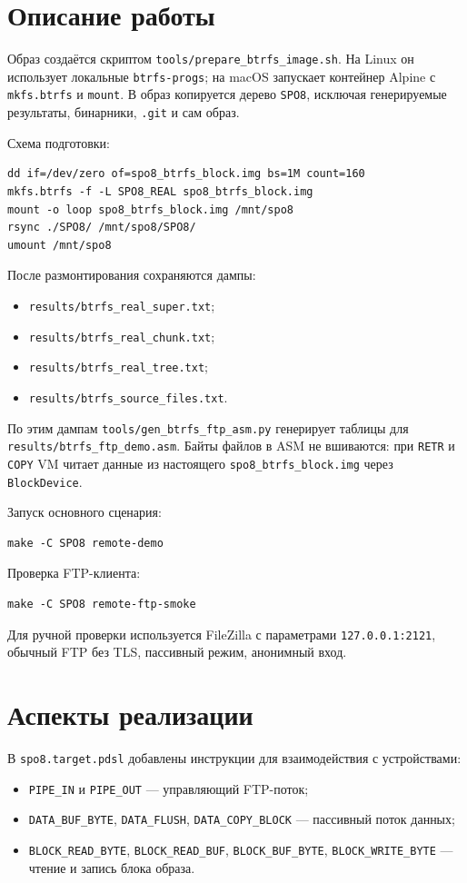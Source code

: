 \documentclass[a4paper,12pt]{article}
\begin{document}
\section{Описание работы}
Образ создаётся скриптом \texttt{tools/prepare\_btrfs\_image.sh}. На Linux он использует локальные \texttt{btrfs-progs}; на macOS запускает контейнер Alpine с \texttt{mkfs.btrfs} и \texttt{mount}. В образ копируется дерево \texttt{SPO8}, исключая генерируемые результаты, бинарники, \texttt{.git} и сам образ.

Схема подготовки:
\begin{lstlisting}
dd if=/dev/zero of=spo8_btrfs_block.img bs=1M count=160
mkfs.btrfs -f -L SPO8_REAL spo8_btrfs_block.img
mount -o loop spo8_btrfs_block.img /mnt/spo8
rsync ./SPO8/ /mnt/spo8/SPO8/
umount /mnt/spo8
\end{lstlisting}

После размонтирования сохраняются дампы:
\begin{itemize}
\item \texttt{results/btrfs\_real\_super.txt};
\item \texttt{results/btrfs\_real\_chunk.txt};
\item \texttt{results/btrfs\_real\_tree.txt};
\item \texttt{results/btrfs\_source\_files.txt}.
\end{itemize}

По этим дампам \texttt{tools/gen\_btrfs\_ftp\_asm.py} генерирует таблицы для \texttt{results/btrfs\_ftp\_demo.asm}. Байты файлов в ASM не вшиваются: при \texttt{RETR} и \texttt{COPY} VM читает данные из настоящего \texttt{spo8\_btrfs\_block.img} через \texttt{BlockDevice}.

Запуск основного сценария:
\begin{lstlisting}
make -C SPO8 remote-demo
\end{lstlisting}

Проверка FTP-клиента:
\begin{lstlisting}
make -C SPO8 remote-ftp-smoke
\end{lstlisting}

Для ручной проверки используется FileZilla с параметрами \texttt{127.0.0.1:2121}, обычный FTP без TLS, пассивный режим, анонимный вход.

\section{Аспекты реализации}
В \texttt{spo8.target.pdsl} добавлены инструкции для взаимодействия с устройствами:
\begin{itemize}
\item \texttt{PIPE\_IN} и \texttt{PIPE\_OUT} — управляющий FTP-поток;
\item \texttt{DATA\_BUF\_BYTE}, \texttt{DATA\_FLUSH}, \texttt{DATA\_COPY\_BLOCK} — пассивный поток данных;
\item \texttt{BLOCK\_READ\_BYTE}, \texttt{BLOCK\_READ\_BUF}, \texttt{BLOCK\_BUF\_BYTE}, \texttt{BLOCK\_WRITE\_BYTE} — чтение и запись блока образа.
\end{itemize}
\end{document}
